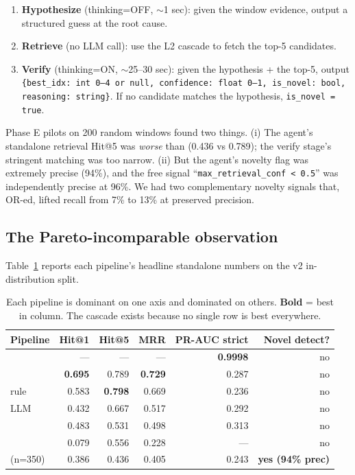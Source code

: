 \begin{enumerate}
\item \textbf{Hypothesize} (thinking=OFF, $\sim$1 sec): given the window evidence, output a structured guess at the root cause.
\item \textbf{Retrieve} (no LLM call): use the L2 cascade to fetch the top-5 candidates.
\item \textbf{Verify} (thinking=ON, $\sim$25--30 sec): given the hypothesis + the top-5, output \texttt{\{best\_idx: int 0--4 or null, confidence: float 0--1, is\_novel: bool, reasoning: string\}}. If no candidate matches the hypothesis, \texttt{is\_novel = true}.
\end{enumerate}

Phase E pilots on 200 random windows found two things. (i) The agent's standalone retrieval Hit@5 was \emph{worse} than \hrrf{} (0.436 vs 0.789); the verify stage's stringent matching was too narrow. (ii) But the agent's novelty flag was extremely precise (94\%), and the free signal ``\texttt{max\_retrieval\_conf < 0.5}'' was independently precise at 96\%. We had two complementary novelty signals that, OR-ed, lifted recall from 7\% to 13\% at preserved precision.

\subsection{The Pareto-incomparable observation}

Table~\ref{tab:pareto-observation} reports each pipeline's headline standalone numbers on the v2 in-distribution split.

\begin{table}[h]
\centering
\caption{Each pipeline is dominant on one axis and dominated on others. \textbf{Bold} = best in column. The cascade exists because no single row is best everywhere.}
\label{tab:pareto-observation}
\small
\begin{tabular}{lrrrrr}
\toprule
Pipeline & Hit@1 & Hit@5 & MRR & PR-AUC strict & Novel detect? \\
\midrule
\hgb{} & --- & --- & --- & \textbf{0.9998} & no \\
\bienc{} & \textbf{0.695} & 0.789 & \textbf{0.729} & 0.287 & no \\
\hrrf{} rule & 0.583 & \textbf{0.798} & 0.669 & 0.236 & no \\
\hrrf{} LLM & 0.432 & 0.667 & 0.517 & 0.292 & no \\
\logseq{} & 0.483 & 0.531 & 0.498 & 0.313 & no \\
\kgret{} & 0.079 & 0.556 & 0.228 & --- & no \\
\agent{} (n=350) & 0.386 & 0.436 & 0.405 & 0.243 & \textbf{yes (94\% prec)} \\
\bottomrule
\end{tabular}
\end{table}

